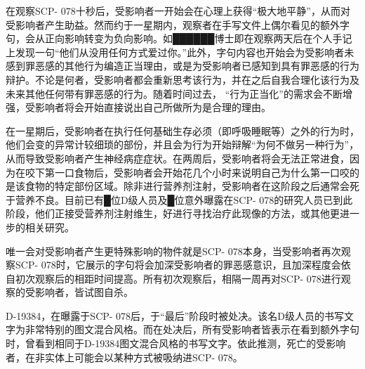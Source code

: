 在观察SCP- 078十秒后，受影响者一开始会在心理上获得“极大地平静”，从而对受影响者产生助益。然而约于一星期内，观察者在手写文件上偶尔看见的额外字句，会从正向影响转变为负向影响。如██████博士即在观察两天后在个人手记上发现一句“他们从没用任何方式爱过你。”此外，字句内容也开始会为受影响者未感到罪恶感的其他行为编造正当理由，或是为受影响者已感知到具有罪恶感的行为辩护。不论是何者，受影响者都会重新思考该行为，并在之后自我合理化该行为及未来其他任何带有罪恶感的行为。随着时间过去， “行为正当化”的需求会不断增强，受影响者将会开始直接说出自己所做所为是合理的理由。

在一星期后，受影响者在执行任何基础生存必须（即呼吸睡眠等）之外的行为时，他们会变的异常计较细琐的部份，并且会为行为开始辩解“为何不做另一种行为”，从而导致受影响者产生神经病症症状。在两周后，受影响者将会无法正常进食，因为在咬下第一口食物后，受影响者会开始花几个小时来说明自己为什么第一口咬的是该食物的特定部份区域。除非进行营养剂注射，受影响者在这阶段之后通常会死于营养不良。目前已有█位D级人员及█位意外曝露在SCP- 078的研究人员已到此阶段，他们正接受营养剂注射维生，好进行寻找治疗此现像的方法，或其他更进一步的相关研究。

唯一会对受影响者产生更特殊影响的物件就是SCP- 078本身，当受影响者再次观察SCP- 078时，它展示的字句将会加深受影响者的罪恶感意识，且加深程度会依自初次观察后的相距时间提高。所有初次观察后，相隔一周再对SCP- 078进行观察的受影响者，皆试图自杀。

D-19384，在曝露于SCP- 078后，于“最后”阶段时被处决。该名D级人员的书写文字为非常特别的图文混合风格。而在处决后，所有受影响者皆表示在看到额外字句时，曾看到相同于D-19384图文混合风格的书写文字。依此推测，死亡的受影响者，在非实体上可能会以某种方式被吸纳进SCP- 078。
